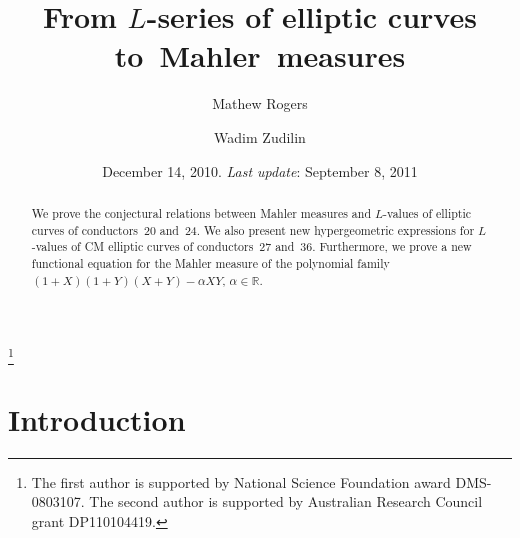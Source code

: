 \documentclass[12pt,reqno]{amsart}
\theoremstyle{remark}
\begin{document}

\title{From $L$-series of elliptic curves to~Mahler~measures}

\author{Mathew Rogers}
\address{Department of Mathematics and Statistics, Universit\'e de Montr\'eal,
CP 6128 succ.\ Centre-ville, Montr\'eal Qu\'ebec H3C\,3J7, Canada}

\author{Wadim Zudilin}
\address{School of Mathematical and Physical Sciences,
The University of Newcastle, Callaghan NSW 2308, AUSTRALIA}

\thanks{The first author is supported by National Science Foundation award DMS-0803107.
The second author is supported by Australian Research Council grant DP110104419.}


\date{December 14, 2010. {\it Last update\/}: September 8, 2011}


\begin{abstract}
We prove the conjectural relations between Mahler measures and
$L$-values of elliptic curves of conductors~20 and~24.  We also
present new hypergeometric expressions for $L$-values of CM
elliptic curves of conductors~27 and~36. Furthermore, we prove a
new functional equation for the Mahler measure of the polynomial
family $(1+X)(1+Y)(X+Y)-\alpha XY$, $\alpha\in\mathbb R$.
\end{abstract}

\maketitle

\section{Introduction}
\label{s-intro}
\end{document}
